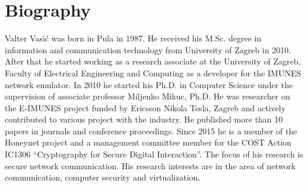 \renewcommand{\leftmark}{Biography}
\chapter*{Biography}

Valter Vasić was born in Pula in 1987. He received his M.Sc. degree in
information and communication technology from University of Zagreb in 2010.
After that he started working as a research associate at the University of
Zagreb, Faculty of Electrical Engineering and Computing as a developer for the
IMUNES network emulator. In 2010 he started his Ph.D. in Computer Science under
the supervision of associate professor Miljenko Mikuc, Ph.D. He was researcher
on the E-IMUNES project funded by Ericsson Nikola Tesla, Zagreb and actively
contributed to various project with the industry.  He published more than 10
papers in journals and conference proceedings. Since 2015 he is a member of the
Honeynet project and a management committee member for the COST Action IC1306
``Cryptography for Secure Digital Interaction''. The focus of his research is
secure network communication. His research interests are in the area of network
communication, computer security and virtualization.
